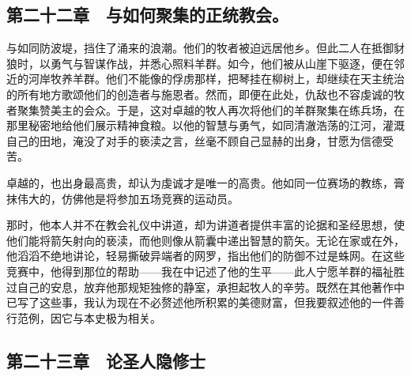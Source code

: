 
\subsection{第二十二章　与如何聚集的正统教会。}

与如同防波堤，挡住了涌来的浪潮。他们的牧者被迫远居他乡。但此二人在抵御豺狼时，以勇气与智谋作战，并悉心照料羊群。如今，他们被从山崖下驱逐，便在邻近的河岸牧养羊群。他们不能像的俘虏那样，把琴挂在柳树上，却继续在天主统治的所有地方歌颂他们的创造者与施恩者。然而，即便在此处，仇敌也不容虔诚的牧者聚集赞美主的会众。于是，这对卓越的牧人再次将他们的羊群聚集在练兵场，在那里秘密地给他们展示精神食粮。以他的智慧与勇气，如同清澈浩荡的江河，灌溉自己的田地，淹没了对手的亵渎之言，丝毫不顾自己显赫的出身，甘愿为信德受苦。\par

卓越的，也出身最高贵，却认为虔诚才是唯一的高贵。他如同一位赛场的教练，膏抹伟大的，仿佛他是将参加五场竞赛的运动员。\par

那时，他本人并不在教会礼仪中讲道，却为讲道者提供丰富的论据和圣经思想，使他们能将箭矢射向的亵渎，而他则像从箭囊中递出智慧的箭矢。无论在家或在外，他滔滔不绝地讲论，轻易撕破异端者的网罗，指出他们的防御不过是蛛网。在这些竞赛中，他得到那位的帮助——我在中记述了他的生平——此人宁愿羊群的福祉胜过自己的安息，放弃他那规矩独修的静室，承担起牧人的辛劳。既然在其他著作中已写了这些事，我认为现在不必赘述他所积累的美德财富，但我要叙述他的一件善行范例，因它与本史极为相关。\par


\subsection{第二十三章　论圣人隐修士}


